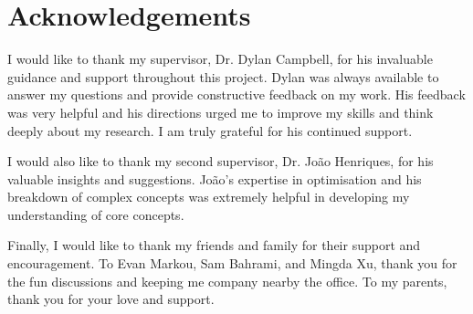 \chapter*{Acknowledgements}

I would like to thank my supervisor, Dr. Dylan Campbell, for his invaluable guidance and support throughout this project. Dylan was always available to answer my questions and provide constructive feedback on my work. His feedback was very helpful and his directions urged me to improve my skills and think deeply about my research. I am truly grateful for his continued support. 

I would also like to thank my second supervisor, Dr. João Henriques, for his valuable insights and suggestions. João's expertise in optimisation and his breakdown of complex concepts was extremely helpful in developing my understanding of core concepts.

Finally, I would like to thank my friends and family for their support and encouragement. To Evan Markou, Sam Bahrami, and Mingda Xu, thank you for the fun discussions and keeping me company nearby the office. To my parents, thank you for your love and support.

